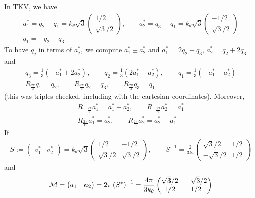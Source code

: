 \documentclass[11pt,a4paper,reqno,french,tikz]{amsart}
\newcommand{\pa}[1]{\left( #1 \right)} %
\newcommand{\f}[2]{\frac{#1}{#2}} %
\newcommand{\mat}[1]{\begin{pmatrix} #1 \end{pmatrix}} %
\begin{document}
In TKV, we have
\begin{multline*}
	a_1^* = q_2 - q_1 = k_\theta \sqrt{3} \mat{1/2 \\ \sqrt{3}/2},\qquad a_2^* = q_3 - q_1 = k_\theta \sqrt{3} \mat{-1/2 \\ \sqrt{3}/2} \\
	q_1 = -q_2 - q_3
\end{multline*}
To have $q_j$ in terms of $a_j^*$, we compute $a_1^* \pm a_2^*$ and $a_1^* = 2q_2 + q_3$, $a_2^* = q_2 + 2 q_3$ and
\begin{align*}
q_3 = \f 13 \pa{-a_1^* + 2 a_2^*},\qquad q_2 = \f 13 \pa{ 2 a_1^* - a_2^*},\qquad q_1 = \f 13 \pa{-a_1^* - a_2^*} \\
R_{\f{2\pi}{3}} q_1 = q_2,\qquad R_{\f{2\pi}{3}} q_2 = q_3,\qquad R_{\f{2\pi}{3}} q_3 = q_1
\end{align*}
(this was triples checked, including with the cartesian coordinates). Moreover,
\begin{multline*}
R_{-\f{2\pi}{6}} a_1^* = a_1^* - a_2^*,\qquad R_{-\f{2\pi}{6}} a_2^* = a_1^* \\
R_{\f{2\pi}{6}} a_1^* = a_2^*,\qquad R_{\f{2\pi}{6}} a_2^* = a_2^* - a_1^*
\end{multline*}
If 
\begin{align*}
	S := \mat{a_1^* & a_2^*} = k_\theta \sqrt{3} \mat{1/2 & -1/2 \\ \sqrt{3}/2 & \sqrt{3}/2}, \qquad S^{-1} = \f{2}{3 k_\theta} \mat{\sqrt{3}/2 & 1/2 \\ -\sqrt{3}/2 & 1/2}
\end{align*}
and
\begin{align*}
\cM = \mat{a_1 & a_2} = 2\pi \pa{S^*}^{-1} = \f{4\pi}{3k_\theta} \mat{\sqrt{3}/2 & - \sqrt{3}/2 \\ 1/2 & 1/2}
\end{align*}
\end{document}
